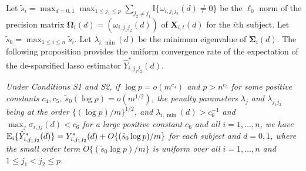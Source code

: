 \documentclass[12pt]{article}
\numberwithin{equation}{section}
\newtheorem{proposition}{Proposition}
\newcommand{\E}{\rm E}
\newcommand{\bX}{{\mathbf X}}
\newcommand{\bOmega}{\boldsymbol{\Omega}}
\newcommand{\bSigma}{\boldsymbol{\Sigma}}
\begin{document}



Let $\tilde{s}_i = \max_{d = 0, 1} \max_{1 \leq j_1 \leq p} \sum_{j_2 \neq j_1} \mathbb{I}\{\omega_{i, j_1j_2}(d) \neq 0\}$ be the $\ell_0$ norm of the precision matrix $\bOmega_{i}(d) = (\omega_{i, j_1j_2}(d))$ of 
$\bX_{i, t}(d)$ for the $i$th subject.
Let $\tilde{s}_0 = \max_{1 \leq i \leq n} \tilde{s}_i$.
Let $\lambda_{i, \min}(d)$ be the minimum eigenvalue of $\bSigma_{i}(d)$.
The following proposition provides the uniform convergence rate of the expectation of the de-sparsified lasso estimator $\hat{Y}_{i, j_1 j_2}^{\ast}(d)$. 

\medskip

{\it Under Conditions S1 and S2, 
if $\log p = o(m^{c_4})$ and $p > n^{c_5}$ for some positive constants $c_4, c_5$,
$\tilde{s}_0 (\log p) = o(m^{1/2})$, the penalty parameters $\lambda_j$ and $\lambda_{j_1j_2}$ being at the order $\{(\log p) / m\}^{1/2}$, and
$\lambda_{i, \min}(d) > c_6^{-1}$ and $\max_{j} \sigma_{i, jj}(d) < c_6$ for a large positive constant $c_6$ and all $i = 1, \ldots, n$,
we have
${\E}_{i}\{\hat{Y}_{i, j_1 j_2}^{\ast}(d)\} = Y^{\ast}_{i, j_1j_2}(d) + O\{ (\tilde{s}_0 \log p) / m\}$ for each subject and $d = 0, 1$, where the small order term $O\{ (\tilde{s}_0 \log p) / m\}$ is uniform over all $i = 1, \ldots, n$ and $1 \leq j_1 < j_2 \leq p$.}
\end{document}
